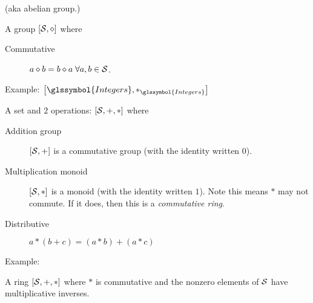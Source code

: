 
(aka abelian group.)

A group $\left[ {\mathcal{S}}, \diamond \right]$ where
\begin{description}
 \item[Commutative] $a \diamond b = b \diamond a \; \forall a,b \in {\mathcal{S}}$.
\end{description}

Example: 
$\left[ \glssymbol{Integers}, *_{\glssymbol{Integers}} \right]$

\label{sec:Ring}
\cite{wiki:Ring-mathematics}

A set and $2$ operations: $\left[ {\mathcal{S}}, +, * \right]$
where
\begin{description}
  \item[Addition group] $\left[ {\mathcal{S}}, + \right]$ 
  is a commutative group (with the identity written $0$).
  \item[Multiplication monoid] $\left[ {\mathcal{S}}, * \right]$ 
  is a monoid (with the identity written $1$).
  Note this means $*$ may not commute. If it does, 
  then this is a \textit{commutative ring}.
  \item[Distributive] $a * \left( b + c \right) 
  = \left( a * b \right) + \left( a * c \right)$
\end{description}

Example:

\label{sec:Field}
\cite{wiki:Field-mathematics}

A ring $\left[ {\mathcal{S}}, +, * \right]$ where
$*$ is commutative and the nonzero elements of ${\mathcal{S}}$
have multiplicative inverses.

